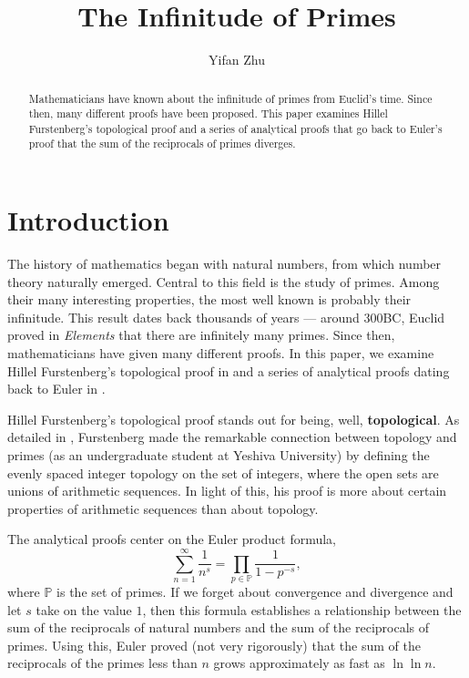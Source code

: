 \documentclass[a4paper]{article}
\theoremstyle{definition}
\theoremstyle{remark}
\begin{document}
\title{The Infinitude of Primes}
\author{
Yifan Zhu
}
\maketitle

\begin{abstract}
  Mathematicians have known about the infinitude of primes from Euclid's time. Since then, many different proofs have been proposed. This paper examines Hillel Furstenberg's topological proof and a series of analytical proofs that go back to Euler's proof that the sum of the reciprocals of primes diverges.
\end{abstract}

\section{Introduction}
The history of mathematics began with natural numbers, from which number theory naturally emerged. Central to this field is the study of primes. Among their many interesting properties, the most well known is probably their infinitude. This result dates back thousands of years --- around 300BC, Euclid proved in \textit{Elements} that there are infinitely many primes\cite{bib:mathHistory}. Since then, mathematicians have given many different proofs. In this paper, we examine Hillel Furstenberg's topological proof in  and a series of analytical proofs dating back to Euler in .

Hillel Furstenberg's topological proof stands out for being, well, \textbf{topological}. As detailed in , Furstenberg made the remarkable connection between topology and primes (as an undergraduate student at Yeshiva University) by defining the evenly spaced integer topology on the set of integers, where the open sets are unions of arithmetic sequences. In light of this, his proof is more about certain properties of arithmetic sequences than about topology. \cite{bib:Furstenberg} \cite{bib:proofsFromTheBook} 

The analytical proofs center on the Euler product formula,
\[
\sum^\infty_{n=1}\frac{1}{n^s}=\prod_{p\in\mathbb{P}}\frac{1}{1-p^{-s}}
,
\]
where $\mathbb{P}$ is the set of primes.
If we forget about convergence and divergence and let $s$ take on the value $1$, then this formula establishes a relationship between the sum of the reciprocals of natural numbers and the sum of the reciprocals of primes. Using this, Euler proved (not very rigorously) that the sum of the reciprocals of the primes less than $n$ grows approximately as fast as $\ln\ln n$.
\end{document}
